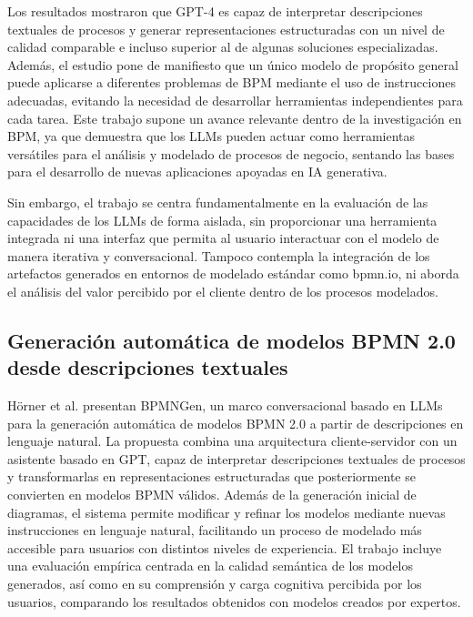 Los resultados mostraron que GPT-4 es capaz de interpretar descripciones 
textuales de procesos y generar representaciones estructuradas con un nivel de calidad comparable e incluso superior al de algunas
soluciones especializadas. Además, el estudio pone de manifiesto que un único modelo de propósito general puede 
aplicarse a diferentes problemas de BPM mediante el uso de instrucciones adecuadas, evitando la necesidad 
de desarrollar herramientas independientes para cada tarea. Este trabajo 
supone un avance relevante dentro de la investigación en BPM, ya que demuestra que los LLMs pueden actuar como herramientas
versátiles para el análisis y modelado de procesos de negocio, sentando las bases para el desarrollo de nuevas aplicaciones apoyadas en IA generativa.


Sin embargo, el trabajo se centra fundamentalmente en la evaluación de las capacidades de los LLMs de forma aislada, 
sin proporcionar una herramienta integrada ni una interfaz que permita al usuario interactuar con el modelo 
de manera iterativa y conversacional. Tampoco contempla la integración de los artefactos 
generados en entornos de modelado estándar como bpmn.io, ni aborda el análisis del valor 
percibido por el cliente dentro de los procesos modelados.

\subsection{Generación automática de modelos BPMN 2.0 desde descripciones textuales}

H\"orner et al. \cite{bise2025bpmn} presentan BPMNGen, un marco conversacional basado en LLMs para la generación 
automática de modelos BPMN 2.0 a partir de descripciones en lenguaje natural. La propuesta combina una arquitectura cliente-servidor 
con un asistente basado en GPT, capaz de interpretar descripciones textuales de procesos
y transformarlas en representaciones estructuradas que posteriormente se convierten en modelos BPMN válidos.
Además de la generación inicial de diagramas, el sistema permite modificar y refinar los modelos mediante nuevas instrucciones
en lenguaje natural, facilitando un proceso de modelado más accesible para usuarios con distintos niveles de experiencia. 
El trabajo incluye una evaluación empírica centrada en la calidad semántica de los modelos generados, así como en su 
comprensión y carga cognitiva percibida por los usuarios, comparando los resultados obtenidos con modelos creados por expertos.


